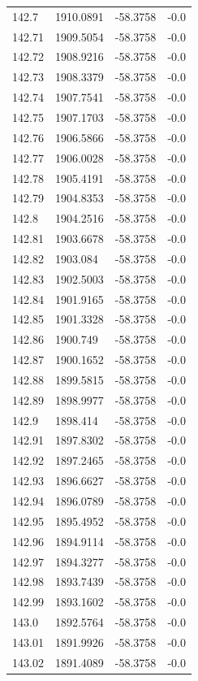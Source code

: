 \begin{table}[H]
\begin{tabular}{llll}
142.7 & 1910.0891 & -58.3758 & -0.0 \\
142.71 & 1909.5054 & -58.3758 & -0.0 \\
142.72 & 1908.9216 & -58.3758 & -0.0 \\
142.73 & 1908.3379 & -58.3758 & -0.0 \\
142.74 & 1907.7541 & -58.3758 & -0.0 \\
142.75 & 1907.1703 & -58.3758 & -0.0 \\
142.76 & 1906.5866 & -58.3758 & -0.0 \\
142.77 & 1906.0028 & -58.3758 & -0.0 \\
142.78 & 1905.4191 & -58.3758 & -0.0 \\
142.79 & 1904.8353 & -58.3758 & -0.0 \\
142.8 & 1904.2516 & -58.3758 & -0.0 \\
142.81 & 1903.6678 & -58.3758 & -0.0 \\
142.82 & 1903.084 & -58.3758 & -0.0 \\
142.83 & 1902.5003 & -58.3758 & -0.0 \\
142.84 & 1901.9165 & -58.3758 & -0.0 \\
142.85 & 1901.3328 & -58.3758 & -0.0 \\
142.86 & 1900.749 & -58.3758 & -0.0 \\
142.87 & 1900.1652 & -58.3758 & -0.0 \\
142.88 & 1899.5815 & -58.3758 & -0.0 \\
142.89 & 1898.9977 & -58.3758 & -0.0 \\
142.9 & 1898.414 & -58.3758 & -0.0 \\
142.91 & 1897.8302 & -58.3758 & -0.0 \\
142.92 & 1897.2465 & -58.3758 & -0.0 \\
142.93 & 1896.6627 & -58.3758 & -0.0 \\
142.94 & 1896.0789 & -58.3758 & -0.0 \\
142.95 & 1895.4952 & -58.3758 & -0.0 \\
142.96 & 1894.9114 & -58.3758 & -0.0 \\
142.97 & 1894.3277 & -58.3758 & -0.0 \\
142.98 & 1893.7439 & -58.3758 & -0.0 \\
142.99 & 1893.1602 & -58.3758 & -0.0 \\
143.0 & 1892.5764 & -58.3758 & -0.0 \\
143.01 & 1891.9926 & -58.3758 & -0.0 \\
143.02 & 1891.4089 & -58.3758 & -0.0 \\

\end{tabular}
\end{table}
